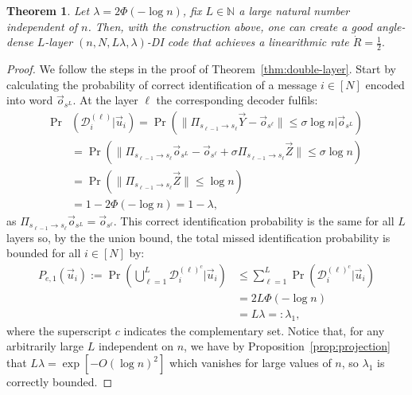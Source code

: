 \documentclass[10pt,conference]{IEEEtran}
\newtheorem{theorem}{Theorem}
\newcommand{\1}{\mathds{1}}
\newcommand{\NN}{\mathbb{N}}
\newcommand{\cD}{\mathcal{D}}
\begin{document}
\begin{theorem}\label{thm:main}
Let $\lambda=2\Phi(-\log n)$, fix $L\in \NN$ a large natural number independent of $n$. Then, with the construction above, one can create a good angle-dense $L$-layer $(n,N,L\lambda,\lambda)$-DI code that achieves a linearithmic rate 
\(
\dot{R}=\frac{1}{2}.
\)
\end{theorem}
\begin{proof}
We follow the steps in the proof of Theorem~\ref{thm:double-layer}. Start by calculating the probability of correct identification of a message $i\in[N]$ encoded into word $\vec{o}_{s^{L}}$. At the layer $\ell$ the corresponding decoder fulfils:
\begin{align}
\!\!\Pr&(\cD_i^{(\ell)}|\vec{u}_i)=\Pr\left(\|\Pi_{s_{\ell-1}\to s_{\ell}}\vec{Y}-\vec{o}_{s^\ell}\|\leq\sigma\log n|\vec{o}_{s^{L}}\right)\nonumber \\
&=\Pr\left(\|\Pi_{s_{\ell-1}\to s_{\ell}}\vec{o}_{s^{L}}-\vec{o}_{s^\ell}+\sigma \Pi_{s_{\ell-1}\to s_{\ell}}\vec{Z}\|\leq \sigma\log n\right)\nonumber\\
&=\Pr\left(\|\Pi_{s_{\ell-1}\to s_{\ell}}\vec{Z}\|\leq\log n\right)\label{eq:layer_error1}\\
&=1-2\Phi(-\log n)=1-\lambda,\nonumber
\end{align}
as $\Pi_{s_{\ell-1}\to s_{\ell}}\vec{o}_{s^{L}}=\vec{o}_{s^\ell}$. This correct identification probability is the same for all $L$ layers so, by the the union bound, the total missed identification probability is bounded for all $i\in[N]$ by:
\begin{equation}\label{eq:main_Pe1}
\begin{split}
\!\!P_{e,1}(\vec{u}_i):=\Pr\left(\bigcup_{\ell=1}^{L}\cD_i^{(\ell)^c}\vert\vec{u}_i\right)&\leq\sum_{\ell=1}^{L}\Pr\left(\cD_i^{(\ell)^c}\vert\vec{u}_i\right)\\
&=2L\Phi(-\log n)\\
&=L\lambda=:\lambda_1,
\end{split}
\end{equation}
where the superscript $c$ indicates the complementary set. Notice that, for any arbitrarily large $L$ independent on $n$, we have by Proposition~\ref{prop:projection} that $L\lambda=\exp [-O(\log n)^2]$ which vanishes for large values of $n$, so $\lambda_1$ is correctly bounded.


\end{proof}
\end{document}
